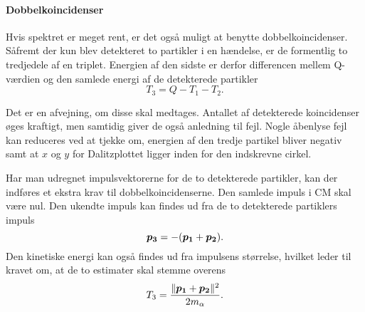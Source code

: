 \paragraph{Dobbelkoincidenser}
\label{sec:dobbelkoincidenser}

Hvis spektret er meget rent, er det også muligt at benytte dobbelkoincidenser. Såfremt der kun blev
detekteret to partikler i en hændelse, er de formentlig to tredjedele af en triplet. Energien af den
sidste er derfor differencen mellem Q-værdien og den samlede energi af de detekterede partikler
\begin{equation}
  \label{eq:dobbeltE}
  T_{3} = Q - T_{1} - T_{2}.
\end{equation}

Det er en afvejning, om disse skal medtages. Antallet af detekterede koincidenser øges kraftigt, men
samtidig giver de også anledning til fejl. Nogle åbenlyse fejl kan reduceres ved at tjekke om,
energien af den tredje partikel bliver negativ samt at $x$ og $y$ for Dalitzplottet ligger inden for
den indskrevne cirkel.

Har man udregnet impulsvektorerne for de to detekterede partikler, kan der indføres
et ekstra krav til dobbelkoincidenserne. Den samlede impuls i CM skal være nul. Den ukendte
impuls kan findes ud fra de to detekterede partiklers impuls
\begin{equation}
  \bm{p_{3}} = -(\bm{p_{1}} + \bm{p_{2}}).
\end{equation}
Den kinetiske energi kan også findes ud fra impulsens størrelse, hvilket leder til kravet om, at de to
estimater skal stemme overens
\begin{equation}
  T_{3} = \frac{\lVert\bm{p_{1}} + \bm{p_{2}}\rVert^{2}}{2m_{\alpha}}.
\end{equation}
